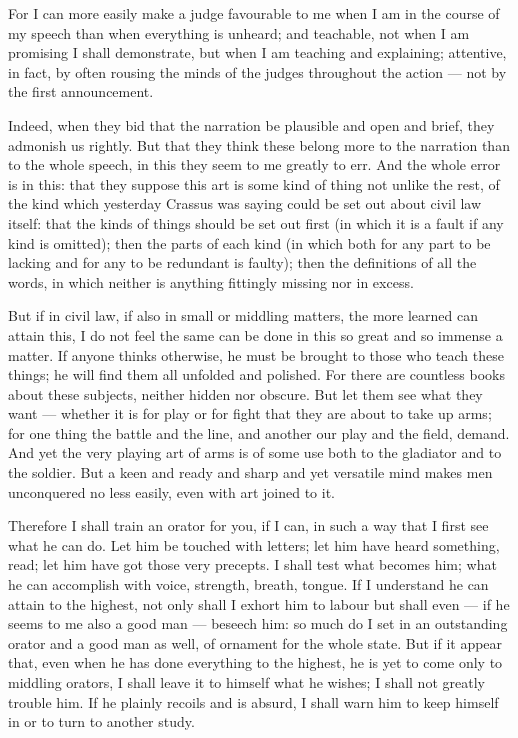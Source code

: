  For I can more easily make a judge favourable to me when I am in the course of my speech than when everything is unheard; and teachable, not when I am promising I shall demonstrate, but when I am teaching and explaining; attentive, in fact, by often rousing the minds of the judges throughout the action — not by the first announcement.

 Indeed, when they bid that the narration be plausible and open and brief, they admonish us rightly. But that they think these belong more to the narration than to the whole speech, in this they seem to me greatly to err. And the whole error is in this: that they suppose this art is some kind of thing not unlike the rest, of the kind which yesterday Crassus was saying could be set out about civil law itself: that the kinds of things should be set out first (in which it is a fault if any kind is omitted); then the parts of each kind (in which both for any part to be lacking and for any to be redundant is faulty); then the definitions of all the words, in which neither is anything fittingly missing nor in excess.

 But if in civil law, if also in small or middling matters, the more learned can attain this, I do not feel the same can be done in this so great and so immense a matter. If anyone thinks otherwise, he must be brought to those who teach these things; he will find them all unfolded and polished. For there are countless books about these subjects, neither hidden nor obscure. But let them see what they want — whether it is for play or for fight that they are about to take up arms; for one thing the battle and the line, and another our play and the field, demand. And yet the very playing art of arms is of some use both to the gladiator and to the soldier. But a keen and ready and sharp and yet versatile mind makes men unconquered no less easily, even with art joined to it.

 Therefore I shall train an orator for you, if I can, in such a way that I first see what he can do. Let him be touched with letters; let him have heard something, read; let him have got those very precepts. I shall test what becomes him; what he can accomplish with voice, strength, breath, tongue. If I understand he can attain to the highest, not only shall I exhort him to labour but shall even — if he seems to me also a good man — beseech him: so much do I set in an outstanding orator and a good man as well, of ornament for the whole state. But if it appear that, even when he has done everything to the highest, he is yet to come only to middling orators, I shall leave it to himself what he wishes; I shall not greatly trouble him. If he plainly recoils and is absurd, I shall warn him to keep himself in or to turn to another study.

